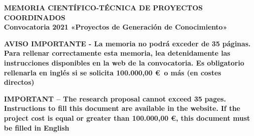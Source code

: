 \documentclass[a4paper,11pt,oneside, english]{article}
\begin{document}
\justifying
\begin{tcolorbox}[colback=white,arc=0pt,outer arc=0pt,colframe=black,boxrule=0.6pt]
  \begin{center}
    {\bf MEMORIA CIENT\'IFICO-T\'ECNICA DE PROYECTOS COORDINADOS\\
    Convocatoria 2021 «Proyectos de Generación de Conocimiento»}
  \end{center}
\end{tcolorbox}
\vspace{-0.2cm}
\begin{tcolorbox}[colback=yellow,arc=0pt,outer arc=0pt,colframe=black,boxrule=0.6pt,left=0mm,right=0mm]
  \begin{center}
    {\bf \small AVISO IMPORTANTE - La memoria no podr\'a exceder de 35 p\'aginas. Para rellenar
      correctamente esta memoria, lea detenidamente las instrucciones disponibles en la web de la
      convocatoria. Es obligatorio rellenarla en ingl\'es si se solicita 100.000,00 \euro\ o m\'as (en costes directos) }
  \end{center}
  \begin{center}
    {\bf \small IMPORTANT -- The research proposal cannot exceed 35 pages. Instructions to fill this document
      are available in the website. If the project cost is equal or greater than 100.000,00 \euro, this document must be
      filled in English}
  \end{center}
\end{tcolorbox}
\end{document}
